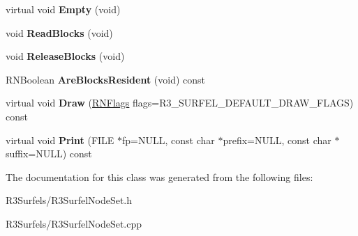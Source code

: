 \begin{DoxyCompactItemize}
\item 
virtual void {\bfseries Empty} (void)\hypertarget{class_r3_surfel_node_set_ab0d4626cb6d097e44c777a24f2a1ac4f}{}\label{class_r3_surfel_node_set_ab0d4626cb6d097e44c777a24f2a1ac4f}

\item 
void {\bfseries Read\+Blocks} (void)\hypertarget{class_r3_surfel_node_set_addf48ba2d8d575a5b3c5e706add8ba4a}{}\label{class_r3_surfel_node_set_addf48ba2d8d575a5b3c5e706add8ba4a}

\item 
void {\bfseries Release\+Blocks} (void)\hypertarget{class_r3_surfel_node_set_a95daa02092f0799d324cbd27c27f73a7}{}\label{class_r3_surfel_node_set_a95daa02092f0799d324cbd27c27f73a7}

\item 
R\+N\+Boolean {\bfseries Are\+Blocks\+Resident} (void) const \hypertarget{class_r3_surfel_node_set_ac4588dd94911bd4c23dc096e84700bf3}{}\label{class_r3_surfel_node_set_ac4588dd94911bd4c23dc096e84700bf3}

\item 
virtual void {\bfseries Draw} (\hyperlink{class_r_n_flags}{R\+N\+Flags} flags=R3\+\_\+\+S\+U\+R\+F\+E\+L\+\_\+\+D\+E\+F\+A\+U\+L\+T\+\_\+\+D\+R\+A\+W\+\_\+\+F\+L\+A\+GS) const \hypertarget{class_r3_surfel_node_set_ae3ffea388c01c8bc2492b1d7ab010ad3}{}\label{class_r3_surfel_node_set_ae3ffea388c01c8bc2492b1d7ab010ad3}

\item 
virtual void {\bfseries Print} (F\+I\+LE $\ast$fp=N\+U\+LL, const char $\ast$prefix=N\+U\+LL, const char $\ast$suffix=N\+U\+LL) const \hypertarget{class_r3_surfel_node_set_acee253e4db3b25f52d2f887a8a0649fe}{}\label{class_r3_surfel_node_set_acee253e4db3b25f52d2f887a8a0649fe}

\end{DoxyCompactItemize}


The documentation for this class was generated from the following files\+:\begin{DoxyCompactItemize}
\item 
R3\+Surfels/R3\+Surfel\+Node\+Set.\+h\item 
R3\+Surfels/R3\+Surfel\+Node\+Set.\+cpp\end{DoxyCompactItemize}
